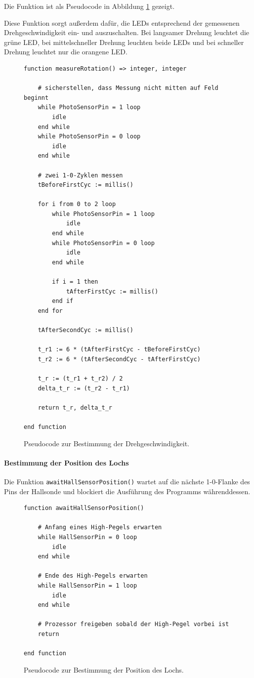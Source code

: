 \documentclass{kis}
\begin{document}
Die Funktion ist als Pseudocode in Abbildung \ref{fig:pseudo-dreh} gezeigt.

Diese Funktion sorgt außerdem dafür, die LEDs entsprechend der gemessenen Drehgeschwindigkeit ein- und auszuschalten. Bei langsamer Drehung leuchtet die grüne LED, bei mittelschneller Drehung leuchten beide LEDs und bei schneller Drehung leuchtet nur die orangene LED.

\begin{figure}
\lstset{basicstyle=\small\ttfamily,tabsize=4}
{\singlespacing
\begin{lstlisting}[frame=single]
function measureRotation() => integer, integer

	# sicherstellen, dass Messung nicht mitten auf Feld beginnt
	while PhotoSensorPin = 1 loop
		idle
	end while
	while PhotoSensorPin = 0 loop
		idle
	end while

	# zwei 1-0-Zyklen messen
	tBeforeFirstCyc := millis()

	for i from 0 to 2 loop
		while PhotoSensorPin = 1 loop
			idle
		end while
		while PhotoSensorPin = 0 loop
			idle
		end while
		
		if i = 1 then
			tAfterFirstCyc := millis()
		end if
	end for	
	
	tAfterSecondCyc := millis()
	
	t_r1 := 6 * (tAfterFirstCyc - tBeforeFirstCyc)
	t_r2 := 6 * (tAfterSecondCyc - tAfterFirstCyc)
	
	t_r := (t_r1 + t_r2) / 2
	delta_t_r := (t_r2 - t_r1)
	
	return t_r, delta_t_r
	
end function
\end{lstlisting}
}
\caption{Pseudocode zur Bestimmung der Drehgeschwindigkeit.}
\label{fig:pseudo-dreh}
\end{figure}

\paragraph{Bestimmung der Position des Lochs}
Die Funktion \texttt{awaitHallSensorPosition()} wartet auf die nächste 1-0-Flanke des Pins der Hallsonde und blockiert die Ausführung des Programms währenddessen. 

\begin{figure}
\lstset{basicstyle=\small\ttfamily,tabsize=3}
{\singlespacing
\begin{lstlisting}[frame=single]
function awaitHallSensorPosition()

	# Anfang eines High-Pegels erwarten
	while HallSensorPin = 0 loop
		idle
	end while
	
	# Ende des High-Pegels erwarten
	while HallSensorPin = 1 loop
		idle
	end while
	
	# Prozessor freigeben sobald der High-Pegel vorbei ist
	return
	
end function
\end{lstlisting}
}
\caption{Pseudocode zur Bestimmung der Position des Lochs.}
\label{fig:pseudo-loch}
\end{figure}
\end{document}
